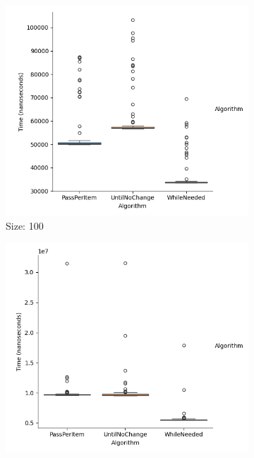 \documentclass{article}
\begin{document}
\begin{figure}[ht]
  \centering
  \begin{subfigure}{0.3\textwidth}
    \centering
    \includegraphics[width=\linewidth]{../figureIntDesc100.png}
    \caption{Size: 100}
    \label{fig:img1}
  \end{subfigure}
  \begin{subfigure}{0.3\textwidth}
    \centering
    \includegraphics[width=\linewidth]{../figureIntDesc1000.png}

\end{subfigure}
\end{figure}
\end{document}
